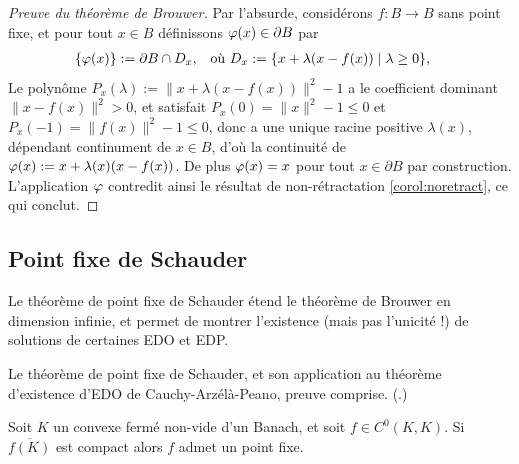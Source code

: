 \begin{proof}[Preuve du théorème de Brouwer]
	Par l'absurde, considérons $f:B\to B$ sans point fixe, 
	et pour tout $x \in B$ définissons $\varphi(x) \in \partial B$ par 	
	\begin{align*}
		\{\varphi(x)\} &:= \partial B \cap D_x, &
		\text{où } D_x &:= \{x + \lambda(x-f(x)) \mid \lambda\geq 0\},
	\end{align*}
	Le polynôme $P_x(\lambda) := \|x+\lambda (x-f(x))\|^2-1$ a le coefficient dominant $\|x-f(x)\|^2 > 0$, et satisfait $P_x(0) = \|x\|^2-1 \leq 0$ et $P_x(-1) = \|f(x)\|^2-1 \leq 0$, donc a une unique racine positive $\lambda(x)$, dépendant continument de $x \in B$, d'où la continuité de $\varphi(x) := x+\lambda(x) (x-f(x))$. De plus $\varphi(x) = x$ pour tout $x \in \partial B$ par construction.
	L'application $\varphi$ contredit ainsi le résultat de non-rétractation \cref{corol:noretract}, ce qui conclut.
\end{proof}

\subsection{Point fixe de Schauder} 
\label{subsec:Schauder}

Le théorème de point fixe de Schauder étend le théorème de Brouwer en dimension infinie, et permet de montrer l'existence (mais pas l'unicité !) de solutions de certaines EDO et EDP. 

\begin{retenir}
Le théorème de point fixe de Schauder, et son application au théorème d'existence d'EDO de Cauchy-Arzélà-Peano, preuve comprise.
(.)	
\end{retenir}

\begin{theorem}
\label{th:Schauder}
%
Soit $K$ un convexe fermé non-vide d'un Banach, et soit $f\in C^0(K,K)$. Si $\overline {f(K)}$ est compact alors $f$ admet un point fixe. 
\end{theorem}

